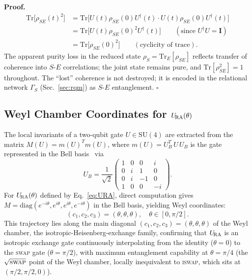 \textbf{Proof.}
\begin{align*}
  \mathrm{Tr}\bigl[\rho_{SE}(t)^2\bigr]
    &= \mathrm{Tr}\bigl[U(t)\rho_{SE}(0)U^\dagger(t)\cdot
                        U(t)\rho_{SE}(0)U^\dagger(t)\bigr] \\
    &= \mathrm{Tr}\bigl[U(t)\rho_{SE}(0)^2 U^\dagger(t)\bigr]
      \qquad (\text{since } U^\dagger U = \mathbf{I}) \\
    &= \mathrm{Tr}\bigl[\rho_{SE}(0)^2\bigr]
      \qquad (\text{cyclicity of trace}).
\end{align*}
The apparent purity loss in the reduced state
$\rho_S = \mathrm{Tr}_E[\rho_{SE}]$ reflects transfer of coherence
into $S$-$E$ correlations; the joint state remains pure, and
$\mathrm{Tr}[\rho_{SE}^2] = 1$ throughout.
The ``lost'' coherence is not destroyed; it is encoded in the
relational network $\Gamma_S$ (Sec.~\ref{sec:rqm}) as $S$-$E$
entanglement. $\square$

\subsection{Weyl Chamber Coordinates for $U_{\!\mathrm{RA}}(\theta)$}

The local invariants of a two-qubit gate $U \in \mathrm{SU}(4)$ are
extracted from the matrix
$M(U) = m(U)^T m(U)$, where $m(U) = U_B^T\, U\, U_B$ is the gate
represented in the Bell basis~\cite{Zhang2003WeylChamber} via
\begin{equation}
  U_B = \frac{1}{\sqrt{2}}
  \begin{pmatrix}
    1 &  0 &  0 &  i \\
    0 &  i &  1 &  0 \\
    0 &  i & -1 &  0 \\
    1 &  0 &  0 & -i
  \end{pmatrix}.
\end{equation}
For $U_{\!\mathrm{RA}}(\theta)$ defined by Eq.~\eqref{eq:URA}, direct computation gives
$M = \mathrm{diag}(e^{-i\theta}, e^{i\theta}, e^{i\theta}, e^{-i\theta})$
in the Bell basis, yielding Weyl coordinates:
\begin{equation}
  (c_1, c_2, c_3) = (\theta, \theta, \theta), \quad \theta \in [0, \pi/2].
  \label{eq:weyl-full}
\end{equation}
This trajectory lies along the main diagonal $(c_1, c_2, c_3) = (\theta, \theta, \theta)$
of the Weyl chamber, the isotropic-Heisenberg-exchange family, confirming
that $U_{\!\mathrm{RA}}$ is an isotropic exchange gate continuously interpolating from
the identity ($\theta = 0$) to the \textsc{swap} gate ($\theta = \pi/2$),
with maximum entanglement capability at $\theta = \pi/4$ (the
$\sqrt{\textsc{swap}}$ point of the Weyl chamber, locally inequivalent to
\textsc{iswap}, which sits at $(\pi/2, \pi/2, 0)$).

